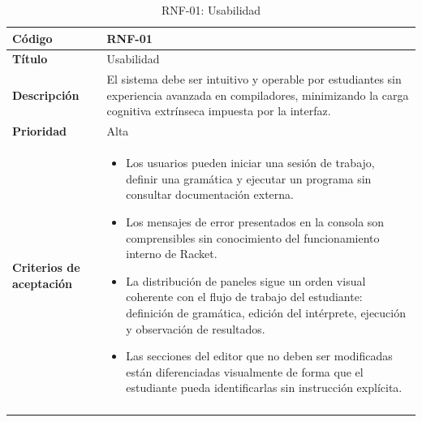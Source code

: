 \begin{longtable}{|>{\bfseries}p{3cm}|p{11cm}|}
\hline
\textbf{Código} & RNF-01 \\
\hline
\textbf{Título} & Usabilidad \\
\hline
\textbf{Descripción} & El sistema debe ser intuitivo y operable por estudiantes sin experiencia avanzada en compiladores, minimizando la carga cognitiva extrínseca impuesta por la interfaz. \\
\hline
\textbf{Prioridad} & Alta \\
\hline
\textbf{Criterios de aceptación} &
\begin{itemize}[leftmargin=*,topsep=2pt,itemsep=1pt,parsep=0pt]
    \item Los usuarios pueden iniciar una sesión de trabajo, definir una gramática y ejecutar un programa sin consultar documentación externa.
    \item Los mensajes de error presentados en la consola son comprensibles sin conocimiento del funcionamiento interno de Racket.
    \item La distribución de paneles sigue un orden visual coherente con el flujo de trabajo del estudiante: definición de gramática, edición del intérprete, ejecución y observación de resultados.
    \item Las secciones del editor que no deben ser modificadas están diferenciadas visualmente de forma que el estudiante pueda identificarlas sin instrucción explícita.
\end{itemize} \\
\hline
\caption{RNF-01: Usabilidad}
\label{tab:rnf01}
\end{longtable}

